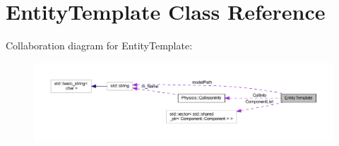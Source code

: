 \hypertarget{class_entity_template}{}\section{Entity\+Template Class Reference}
\label{class_entity_template}


Collaboration diagram for Entity\+Template\+:
\nopagebreak
\begin{figure}[H]
\begin{center}
\leavevmode
\includegraphics[width=350pt]{class_entity_template__coll__graph}
\end{center}
\end{figure}
